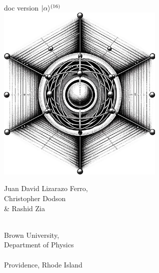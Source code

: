 \documentclass[11pt, twoside,openright]{article}
\begin{document}
 

\begin{titlepage} %
    \centering
    \vspace*{\fill}
    
    {\Large\qlanth}\\
    {\large doc version $|\alpha\rangle^{(16)}$} \\
    \vspace*{0.5cm}
    \includegraphics[width=0.6\textwidth]{ion_in_lattice.jpg}  %
    \vspace*{0.4cm} %
    
    {\large Juan David Lizarazo Ferro,}\\
    {\large Christopher Dodson}\\
    {\large \& Rashid Zia}\\
    
	\vspace*{\fill}
\end{titlepage}

\newpage

\thispagestyle{empty}
\vspace*{\fill}
\begin{center}
$\,$ \\
{\large Brown University, \\ Department of Physics}\\
\vspace{0.2cm}
\hrulefill \\
\vspace{0.2cm}
Providence, Rhode Island \\
\end{center}
\end{document}
